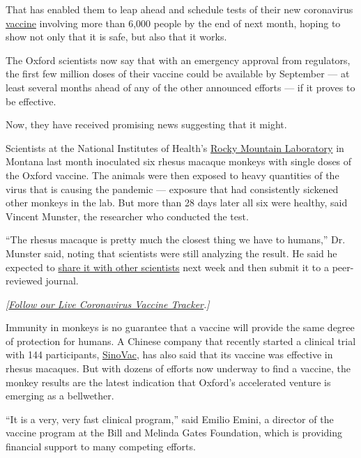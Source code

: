 That has enabled them to leap ahead and schedule tests of their new
coronavirus
\href{https://www.nytimes.com/2020/05/15/us/politics/coronavirus-vaccine-timeline.html}{vaccine}
involving more than 6,000 people by the end of next month, hoping to
show not only that it is safe, but also that it works.

The Oxford scientists now say that with an emergency approval from
regulators, the first few million doses of their vaccine could be
available by September --- at least several months ahead of any of the
other announced efforts --- if it proves to be effective.

Now, they have received promising news suggesting that it might.

Scientists at the National Institutes of Health's
\href{https://www.niaid.nih.gov/about/rocky-mountain-overview}{Rocky
Mountain Laboratory} in Montana last month inoculated six rhesus macaque
monkeys with single doses of the Oxford vaccine. The animals were then
exposed to heavy quantities of the virus that is causing the pandemic
--- exposure that had consistently sickened other monkeys in the lab.
But more than 28 days later all six were healthy, said Vincent Munster,
the researcher who conducted the test.

``The rhesus macaque is pretty much the closest thing we have to
humans,'' Dr. Munster said, noting that scientists were still analyzing
the result. He said he expected to
\href{https://www.nytimes.com/2020/04/01/world/europe/coronavirus-science-research-cooperation.html}{share
it with other scientists} next week and then submit it to a
peer-reviewed journal.

\emph{{[}}\href{https://www.nytimes.com/interactive/2020/science/coronavirus-vaccine-tracker.html}{\emph{Follow
our Live Coronavirus Vaccine Tracker}}\emph{.{]}}

Immunity in monkeys is no guarantee that a vaccine will provide the same
degree of protection for humans. A Chinese company that recently started
a clinical trial with 144 participants,
\href{https://www.sciencemag.org/news/2020/04/covid-19-vaccine-protects-monkeys-new-coronavirus-chinese-biotech-reports}{SinoVac},
has also said that its vaccine was effective in rhesus macaques. But
with dozens of efforts now underway to find a vaccine, the monkey
results are the latest indication that Oxford's accelerated venture is
emerging as a bellwether.

``It is a very, very fast clinical program,'' said Emilio Emini, a
director of the vaccine program at the Bill and Melinda Gates
Foundation, which is providing financial support to many competing
efforts.

